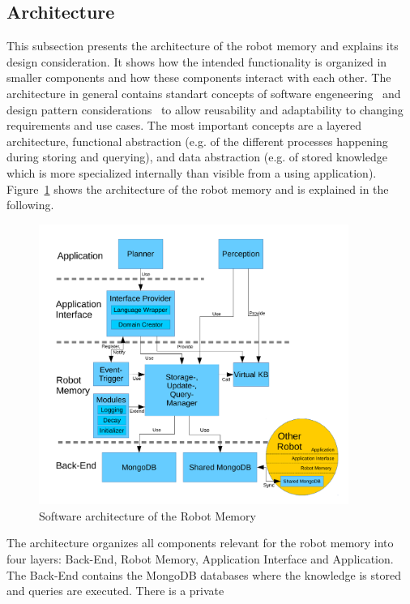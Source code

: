 \documentclass[a4paper,11pt]{article}
\newcommand{\reffig}[1]{Figure~\ref{#1}}
\begin{document}
\subsection{Architecture}
\label{sec:arch}
This subsection presents the architecture of the robot memory and
explains its design consideration. It shows how the intended
functionality is organized in smaller components and how these
components interact with each other.  The architecture in general
contains standart concepts of software
engeneering~\cite{software-architecture} and design pattern
considerations~\cite{design-patterns} to allow reusability and
adaptability to changing requirements and use cases. The most
important concepts are a layered architecture, functional abstraction
(e.g. of the different processes happening during storing and
querying), and data abstraction (e.g. of stored knowledge which is
more specialized internally than visible from a using
application). \reffig{fig:arch} shows the architecture of the robot
memory and is explained in the following.
\begin{figure}
  \centering
  \includegraphics[width=0.9\textwidth]{architecture.pdf}
  \caption{Software architecture of the Robot Memory}
  \label{fig:arch}
\end{figure}
The architecture organizes all components relevant for the robot
memory into four layers: Back-End, Robot Memory, Application Interface
and Application. The Back-End contains the MongoDB databases where the
knowledge is stored and queries are executed. There is a private
\end{document}
